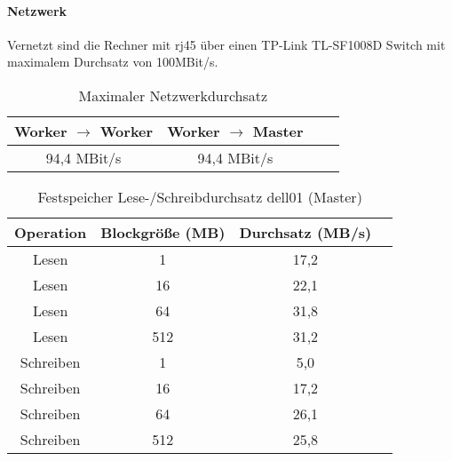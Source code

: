 \paragraph{Netzwerk}
Vernetzt sind die Rechner mit \gls{rj45} über einen TP-Link TL-SF1008D Switch mit maximalem Durchsatz von 100MBit/s.

\begin{table}[ht]
	\caption{Maximaler Netzwerkdurchsatz} %
	\centering %
	\begin{tabular}{c c c c} %
	\hline\hline %
	Worker $\rightarrow$ Worker & Worker $\rightarrow$ Master \\ [0.5ex] %
	\hline %
	94,4 MBit/s & 94,4 MBit/s\\ [1ex] 
	\hline %
	\end{tabular}
	\label{table:network} %
\end{table}

\begin{table}[ht]
	\caption{Festspeicher Lese-/Schreibdurchsatz dell01 (Master)} %
	\centering %
	\begin{tabular}{c c c c} %
	\hline\hline %
	Operation & Blockgröße (MB) & Durchsatz (MB/s) \\ [0.5ex] %
	\hline %
	Lesen & 1 & 17,2 \\ 
	Lesen & 16 & 22,1 \\
	Lesen & 64 & 31,8 \\
	Lesen & 512 & 31,2 \\
	Schreiben & 1 & 5,0 \\
	Schreiben & 16 & 17,2 \\
	Schreiben & 64 & 26,1 \\
	Schreiben & 512 & 25,8 \\[1ex] 
	\hline %
	\end{tabular}
	\label{table:master_harddrive} %
\end{table}

